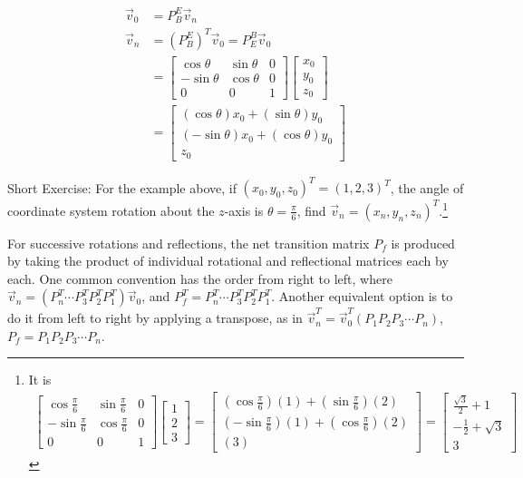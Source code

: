 \begin{solution}
\begin{align*}
\vec{v}_0 &= P_B^E \vec{v}_n \\
\vec{v}_n &= (P_B^E)^T\vec{v}_0 = P_E^B\vec{v}_0 \\
&=
\begin{bmatrix}
\cos \theta & \sin \theta & 0 \\
-\sin \theta & \cos \theta & 0 \\
0 & 0 & 1
\end{bmatrix}
\begin{bmatrix}
x_0 \\
y_0 \\
z_0
\end{bmatrix} \\
&=
\begin{bmatrix}
(\cos\theta)x_0+(\sin\theta)y_0 \\
(-\sin\theta)x_0+(\cos\theta)y_0 \\
z_0
\end{bmatrix}
\end{align*}
\end{solution}
Short Exercise: For the example above, if $(x_0, y_0, z_0)^T = (1,2,3)^T$, the angle of coordinate system rotation about the $z$-axis is $\theta = \frac{\pi}{6}$, find $\vec{v}_n = (x_n, y_n, z_n)^T$.\footnote{It is
\begin{align*}
\begin{bmatrix}
\cos \frac{\pi}{6} & \sin \frac{\pi}{6} & 0 \\
-\sin \frac{\pi}{6} & \cos \frac{\pi}{6} & 0 \\
0 & 0 & 1
\end{bmatrix}
\begin{bmatrix}
1 \\
2 \\
3
\end{bmatrix} 
=
\begin{bmatrix}
(\cos\frac{\pi}{6})(1)+(\sin\frac{\pi}{6})(2) \\
(-\sin\frac{\pi}{6})(1)+(\cos\frac{\pi}{6})(2) \\
(3)
\end{bmatrix}
=
\begin{bmatrix}
\frac{\sqrt{3}}{2} + 1 \\
-\frac{1}{2} + \sqrt{3}\\
3
\end{bmatrix}
\end{align*}
}

For successive rotations and reflections, the net transition matrix $P_f$ is produced by taking the product of individual rotational and reflectional matrices each by each. One common convention has the order from right to left, where $\vec{v}_n = (P_n^T\cdots P_3^TP_2^TP_1^T)\vec{v}_0$, and $P_f^T = P_n^T\cdots P_3^TP_2^TP_1^T$. Another equivalent option is to do it from left to right by applying a transpose, as in
$\vec{v}_n^T = \vec{v}_0^T(P_1P_2P_3\cdots P_n)$, $P_f = P_1P_2P_3\cdots P_n$.

